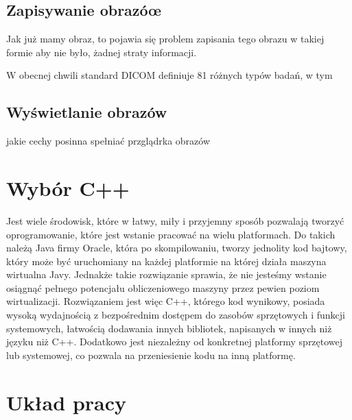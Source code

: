 \subsection{Zapisywanie obrazóœ}

Jak już mamy obraz, to pojawia się problem zapisania tego obrazu w takiej formie aby nie było, żadnej straty informacji.

W obecnej chwili standard DICOM definiuje 81 różnych typów badań, w tym

\subsection{Wyświetlanie obrazów}



jakie cechy posinna spełniać przglądrka obrazów


\section{Wybór C++}

Jest wiele środowisk, które w łatwy, miły i przyjemny sposób pozwalają tworzyć oprogramowanie, które jest wstanie pracować na wielu platformach.
Do takich należą Java firmy Oracle, która po skompilowaniu, tworzy jednolity kod bajtowy, który może być uruchomiany na każdej platformie na której działa maszyna wirtualna Javy.
Jednakże takie rozwiązanie sprawia, że nie jesteśmy wstanie osiągnąć pełnego potencjału obliczeniowego maszyny przez pewien poziom wirtualizacji.
Rozwiązaniem jest więc C++, którego kod wynikowy, posiada wysoką wydajnością z bezpośrednim dostępem do zasobów sprzętowych i funkcji systemowych, łatwością dodawania innych bibliotek, napisanych w innych niż języku niż C++.
Dodatkowo jest niezależny od konkretnej platformy sprzętowej lub systemowej, co pozwala na przeniesienie kodu na inną platformę.

\section{Układ pracy}